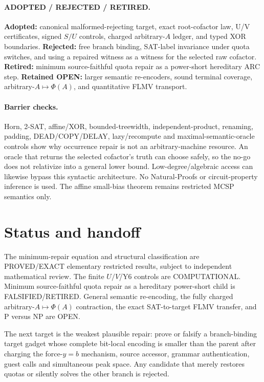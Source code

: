 \documentclass[11pt]{article}
\newcommand{\status}[1]{\textsf{#1}}
\begin{document}
\paragraph{ADOPTED / REJECTED / RETIRED.}
\textbf{Adopted:} canonical malformed-rejecting target, exact root-cofactor
law, U/V certificates, signed $S/U$ controls, charged arbitrary-$A$ ledger,
and typed XOR boundaries.  \textbf{Rejected:} free branch binding, SAT-label
invariance under quota switches, and using a repaired witness as a witness
for the selected raw cofactor.  \textbf{Retired:} minimum source-faithful
quota repair as a power-short hereditary ARC step.  \textbf{Retained OPEN:}
larger semantic re-encoders, sound terminal coverage, arbitrary-$A\mapsto
\Phi(A)$, and quantitative FLMV transport.

\paragraph{Barrier checks.}
Horn, 2-SAT, affine/XOR, bounded-treewidth, independent-product, renaming,
padding, DEAD/COPY/DELAY, lazy/recompute and maximal-semantic-oracle controls
show why occurrence repair is not an arbitrary-machine resource.  An oracle
that returns the selected cofactor's truth can choose safely, so the no-go
does not relativize into a general lower bound.  Low-degree/algebraic access
can likewise bypass this syntactic architecture.  No Natural-Proofs or
circuit-property inference is used.  The affine small-bias theorem remains
restricted MCSP semantics only.

\section{Status and handoff}
The minimum-repair equation and structural classification are
\status{PROVED/EXACT} elementary restricted results, subject to independent
mathematical review.  The finite $U/V$/Y6 controls are
\status{COMPUTATIONAL}.  Minimum source-faithful quota repair as a hereditary
power-short child is \status{FALSIFIED/RETIRED}.  General semantic
re-encoding, the fully charged arbitrary-$A\mapsto\Phi(A)$ contraction,
the exact SAT-to-target FLMV transfer, and P versus NP are \status{OPEN}.

The next target is the weakest plausible repair: prove or falsify a
branch-binding target gadget whose complete bit-local encoding is smaller
than the parent after charging the force-$y=b$ mechanism, source accessor,
grammar authentication, guest calls and simultaneous peak space.  Any
candidate that merely restores quotas or silently solves the other branch
is rejected.
\end{document}
